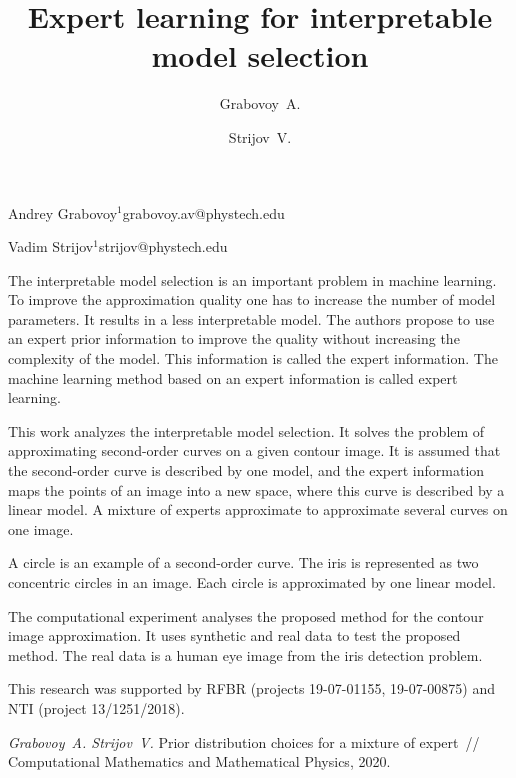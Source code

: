 \documentclass[twoside]{article}
\begin{document}
\English
\title{Expert learning for interpretable model selection}
\author{Grabovoy~A.}{Andrey Grabovoy$^1$\speaker}{grabovoy.av@phystech.edu}
\author{Strijov~V.}{Vadim Strijov$^{1}$}{strijov@phystech.edu}
\maketitle
The interpretable model selection is an important problem in machine learning. To improve the approximation quality one has to increase the number of model parameters. It results in a less interpretable model. The authors propose to use an expert prior information to improve the quality without increasing the complexity of the model. This information is called the expert information. The machine learning method based on an expert information is called expert learning.

This work analyzes the interpretable model selection. It solves the problem of approximating second-order curves on a given contour image.
It is assumed that the second-order curve is described by one model, and the expert information maps the points of an image into a new space, where this curve is described by a linear model.
 A mixture of experts approximate to approximate several curves on one image.

A circle is an example of a second-order curve. The iris is represented as two concentric circles in an image. Each circle is approximated by one linear model.

The computational experiment analyses the proposed method for the contour image approximation. It uses synthetic and real data to test the proposed method. The real data is a human eye image from the iris detection problem.

This research was supported by RFBR (projects 19-07-01155, 19-07-00875) and NTI (project 13/1251/2018).

\begin{thebibliography}{1}
    \emph{Grabovoy~A.  Strijov~V.}
    Prior distribution choices for a mixture of expert~// Computational Mathematics and Mathematical Physics, 2020.
\end{thebibliography}
\end{document}
